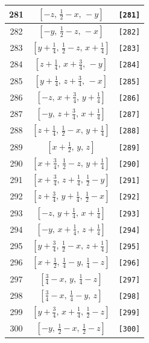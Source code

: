 \documentclass[fleqn,8pt]{jsarticle}
\begin{document}
\begin{longtable}{ccc}
281 & $\left[ - z,\, \frac{1}{2} - x,\, - y \right]$ & {\tt [281]} \\ \hline
282 & $\left[ - y,\, \frac{1}{2} - z,\, - x \right]$ & {\tt [282]} \\ \hline
283 & $\left[ y + \frac{1}{4},\, \frac{1}{2} - z,\, x + \frac{1}{4} \right]$ & {\tt [283]} \\ \hline
284 & $\left[ z + \frac{1}{4},\, x + \frac{3}{4},\, - y \right]$ & {\tt [284]} \\ \hline
285 & $\left[ y + \frac{1}{4},\, z + \frac{3}{4},\, - x \right]$ & {\tt [285]} \\ \hline
286 & $\left[ - z,\, x + \frac{3}{4},\, y + \frac{1}{4} \right]$ & {\tt [286]} \\ \hline
287 & $\left[ - y,\, z + \frac{3}{4},\, x + \frac{1}{4} \right]$ & {\tt [287]} \\ \hline
288 & $\left[ z + \frac{1}{4},\, \frac{1}{2} - x,\, y + \frac{1}{4} \right]$ & {\tt [288]} \\ \hline
289 & $\left[ x + \frac{1}{2},\, y,\, z \right]$ & {\tt [289]} \\ \hline
290 & $\left[ x + \frac{3}{4},\, \frac{1}{2} - z,\, y + \frac{1}{4} \right]$ & {\tt [290]} \\ \hline
291 & $\left[ x + \frac{3}{4},\, z + \frac{1}{4},\, \frac{1}{2} - y \right]$ & {\tt [291]} \\ \hline
292 & $\left[ z + \frac{3}{4},\, y + \frac{1}{4},\, \frac{1}{2} - x \right]$ & {\tt [292]} \\ \hline
293 & $\left[ - z,\, y + \frac{1}{4},\, x + \frac{1}{4} \right]$ & {\tt [293]} \\ \hline
294 & $\left[ - y,\, x + \frac{1}{4},\, z + \frac{1}{4} \right]$ & {\tt [294]} \\ \hline
295 & $\left[ y + \frac{3}{4},\, \frac{1}{2} - x,\, z + \frac{1}{4} \right]$ & {\tt [295]} \\ \hline
296 & $\left[ x + \frac{1}{2},\, \frac{1}{4} - y,\, \frac{1}{4} - z \right]$ & {\tt [296]} \\ \hline
297 & $\left[ \frac{3}{4} - x,\, y,\, \frac{1}{4} - z \right]$ & {\tt [297]} \\ \hline
298 & $\left[ \frac{3}{4} - x,\, \frac{1}{4} - y,\, z \right]$ & {\tt [298]} \\ \hline
299 & $\left[ y + \frac{3}{4},\, x + \frac{1}{4},\, \frac{1}{2} - z \right]$ & {\tt [299]} \\ \hline
300 & $\left[ - y,\, \frac{1}{2} - x,\, \frac{1}{2} - z \right]$ & {\tt [300]} \\ \hline

\end{longtable}
\end{document}
